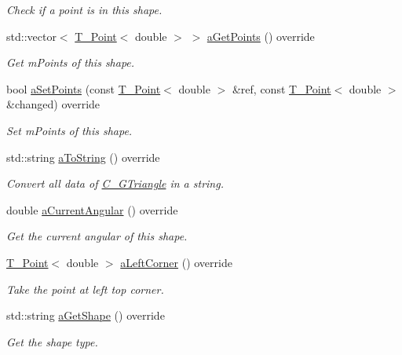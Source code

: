 \begin{DoxyCompactItemize}
\begin{DoxyCompactList}\small\item\em Check if a point is in this shape. \end{DoxyCompactList}\item 
std\+::vector$<$ \hyperlink{classT__Point}{T\+\_\+\+Point}$<$ double $>$ $>$ \hyperlink{classC__GTriangle_aa18970aab947266cab2d4a9f664926a0}{a\+Get\+Points} () override
\begin{DoxyCompactList}\small\item\em Get m\+Points of this shape. \end{DoxyCompactList}\item 
bool \hyperlink{classC__GTriangle_a18c134ddf90bc4f5729064a47094068b}{a\+Set\+Points} (const \hyperlink{classT__Point}{T\+\_\+\+Point}$<$ double $>$ \&ref, const \hyperlink{classT__Point}{T\+\_\+\+Point}$<$ double $>$ \&changed) override
\begin{DoxyCompactList}\small\item\em Set m\+Points of this shape. \end{DoxyCompactList}\item 
std\+::string \hyperlink{classC__GTriangle_aa432e8b8320db8a53ef1d59b486ed7ce}{a\+To\+String} () override
\begin{DoxyCompactList}\small\item\em Convert all data of \hyperlink{classC__GTriangle}{C\+\_\+\+G\+Triangle} in a string. \end{DoxyCompactList}\item 
double \hyperlink{classC__GTriangle_a98866648972bb78707c61aa7ebc22fb9}{a\+Current\+Angular} () override
\begin{DoxyCompactList}\small\item\em Get the current angular of this shape. \end{DoxyCompactList}\item 
\hyperlink{classT__Point}{T\+\_\+\+Point}$<$ double $>$ \hyperlink{classC__GTriangle_a527bdcfbcba0747c0d16d0472d0b15d8}{a\+Left\+Corner} () override
\begin{DoxyCompactList}\small\item\em Take the point at left top corner. \end{DoxyCompactList}\item 
std\+::string \hyperlink{classC__GTriangle_a039e79bb17dae01997b11243de457d98}{a\+Get\+Shape} () override
\begin{DoxyCompactList}\small\item\em Get the shape type. \end{DoxyCompactList}\item 

\end{DoxyCompactItemize}
